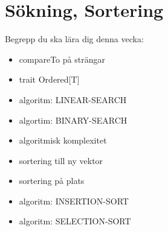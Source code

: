 \chapter{Sökning, Sortering}\label{chapter:W10}
Begrepp du ska lära dig denna vecka:
\begin{itemize}[noitemsep,label={$\square$},leftmargin=*]
\item compareTo på strängar
\item trait Ordered[T]
\item algoritm: LINEAR-SEARCH
\item algortim: BINARY-SEARCH
\item algoritmisk komplexitet
\item sortering till ny vektor
\item sortering på plats
\item algoritm: INSERTION-SORT
\item algoritm: SELECTION-SORT\end{itemize}
